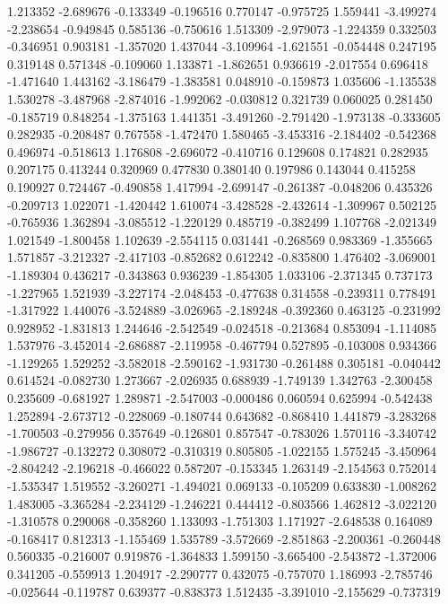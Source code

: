 1.213352
-2.689676
-0.133349
-0.196516
0.770147
-0.975725
1.559441
-3.499274
-2.238654
-0.949845
0.585136
-0.750616
1.513309
-2.979073
-1.224359
0.332503
-0.346951
0.903181
-1.357020
1.437044
-3.109964
-1.621551
-0.054448
0.247195
0.319148
0.571348
-0.109060
1.133871
-1.862651
0.936619
-2.017554
0.696418
-1.471640
1.443162
-3.186479
-1.383581
0.048910
-0.159873
1.035606
-1.135538
1.530278
-3.487968
-2.874016
-1.992062
-0.030812
0.321739
0.060025
0.281450
-0.185719
0.848254
-1.375163
1.441351
-3.491260
-2.791420
-1.973138
-0.333605
0.282935
-0.208487
0.767558
-1.472470
1.580465
-3.453316
-2.184402
-0.542368
0.496974
-0.518613
1.176808
-2.696072
-0.410716
0.129608
0.174821
0.282935
0.207175
0.413244
0.320969
0.477830
0.380140
0.197986
0.143044
0.415258
0.190927
0.724467
-0.490858
1.417994
-2.699147
-0.261387
-0.048206
0.435326
-0.209713
1.022071
-1.420442
1.610074
-3.428528
-2.432614
-1.309967
0.502125
-0.765936
1.362894
-3.085512
-1.220129
0.485719
-0.382499
1.107768
-2.021349
1.021549
-1.800458
1.102639
-2.554115
0.031441
-0.268569
0.983369
-1.355665
1.571857
-3.212327
-2.417103
-0.852682
0.612242
-0.835800
1.476402
-3.069001
-1.189304
0.436217
-0.343863
0.936239
-1.854305
1.033106
-2.371345
0.737173
-1.227965
1.521939
-3.227174
-2.048453
-0.477638
0.314558
-0.239311
0.778491
-1.317922
1.440076
-3.524889
-3.026965
-2.189248
-0.392360
0.463125
-0.231992
0.928952
-1.831813
1.244646
-2.542549
-0.024518
-0.213684
0.853094
-1.114085
1.537976
-3.452014
-2.686887
-2.119958
-0.467794
0.527895
-0.103008
0.934366
-1.129265
1.529252
-3.582018
-2.590162
-1.931730
-0.261488
0.305181
-0.040442
0.614524
-0.082730
1.273667
-2.026935
0.688939
-1.749139
1.342763
-2.300458
0.235609
-0.681927
1.289871
-2.547003
-0.000486
0.060594
0.625994
-0.542438
1.252894
-2.673712
-0.228069
-0.180744
0.643682
-0.868410
1.441879
-3.283268
-1.700503
-0.279956
0.357649
-0.126801
0.857547
-0.783026
1.570116
-3.340742
-1.986727
-0.132272
0.308072
-0.310319
0.805805
-1.022155
1.575245
-3.450964
-2.804242
-2.196218
-0.466022
0.587207
-0.153345
1.263149
-2.154563
0.752014
-1.535347
1.519552
-3.260271
-1.494021
0.069133
-0.105209
0.633830
-1.008262
1.483005
-3.365284
-2.234129
-1.246221
0.444412
-0.803566
1.462812
-3.022120
-1.310578
0.290068
-0.358260
1.133093
-1.751303
1.171927
-2.648538
0.164089
-0.168417
0.812313
-1.155469
1.535789
-3.572669
-2.851863
-2.200361
-0.260448
0.560335
-0.216007
0.919876
-1.364833
1.599150
-3.665400
-2.543872
-1.372006
0.341205
-0.559913
1.204917
-2.290777
0.432075
-0.757070
1.186993
-2.785746
-0.025644
-0.119787
0.639377
-0.838373
1.512435
-3.391010
-2.155629
-0.737319
